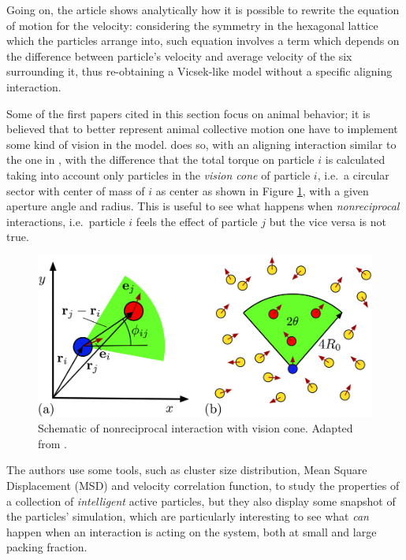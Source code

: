 \documentclass[../../master_thesis_np.tex]{subfiles}
\begin{document}
	Going on, the article shows analytically how it is possible to rewrite the equation of motion for the velocity: considering the symmetry in the hexagonal lattice which the particles arrange into, such equation involves a term which depends on the difference between particle's velocity and average velocity of the six surrounding it, thus re-obtaining a Vicsek-like model without a specific aligning interaction.
	
	Some of the first papers cited in this section focus on animal behavior; it is believed that to better represent animal collective motion one have to implement some kind of vision in the model. 
	\cite{negi_emergent_2022} does so, with an aligning interaction similar to the one in \cite{martin-gomez_collective_2018}, with the difference that the total torque on particle $i$ is calculated taking into account only particles in the \emph{vision cone} of particle $i$, i.e.\ a circular sector with center of mass of $i$ as center as shown in Figure \ref{fig:negi_vision1}, with a given aperture angle and radius. 
	This is useful to see what happens when \emph{nonreciprocal} interactions, i.e.\ particle $i$ feels the effect of particle $j$ but the vice versa is not true.
	
	\begin{figure}[htp]
		\centering
		\includegraphics[width=\singfigwidth]{negi_vision1.png}
		\caption{Schematic of nonreciprocal interaction with vision cone. Adapted from \cite{negi_emergent_2022}.}
		\label{fig:negi_vision1}
	\end{figure}
	
	
	The authors use some tools, such as cluster size distribution, Mean Square Displacement (MSD) and velocity correlation function, to study the properties of a collection of \emph{intelligent} active particles, but they also display some snapshot of the particles' simulation, which are particularly interesting to see what \emph{can} happen when an interaction is acting on the system, both at small and large packing fraction. 
	
\end{document}
